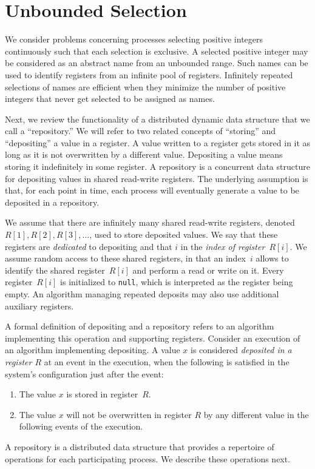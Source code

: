 \documentclass[11pt]{article}
\begin{document}
\section{Unbounded Selection}





We consider problems concerning processes selecting positive integers continuously such that each selection is exclusive.
A selected positive integer may be considered as an abstract name from an unbounded range.
Such names can be used to identify registers from an infinite pool of registers.
Infinitely repeated selections of names are efficient when they minimize the number of positive  integers that  never get selected to be assigned as names.

Next, we review the functionality of a distributed dynamic data structure that we call a ``repository.''
We will refer to two related concepts of ``storing'' and ``depositing'' a value in a register.
A value written to a register gets stored in it as long as it is not overwritten by a different value.
Depositing a value means  storing it indefinitely in some register.
A repository is a concurrent data structure for depositing values in shared read-write registers.
The underlying assumption is that, for each point in time, each process will eventually generate a value to be deposited in a repository.

We assume that there are infinitely many shared read-write registers, denoted $R[1], R[2], R[3],\ldots$, used to store deposited values.
We say that these registers are \emph{dedicated} to depositing and that $i$ in the \emph{index of register~$R[i]$}.
We assume random access to these shared registers, in that an index~$i$ allows to identify the shared register~$R[i]$ and perform a read or write on it.
Every register~$R[i]$ is initialized to \texttt{null}, which is interpreted as the register being empty. 
An algorithm managing repeated deposits may also use additional auxiliary registers.


A formal definition of depositing and a repository refers to an algorithm implementing this operation and supporting registers.
Consider an execution of an algorithm implementing depositing.
A value $x$ is considered \emph{deposited in a register $R$} at an event in the execution, when the following is satisfied in the system's configuration just after the event:
\begin{enumerate}
\item
The value $x$ is stored in register~$R$. 

\item
The value $x$ will not be overwritten in register $R$  by any different value in the following events of the execution.
\end{enumerate}
A repository is a distributed data structure that provides a repertoire of operations for each participating process.
We describe these operations next.
\end{document}
